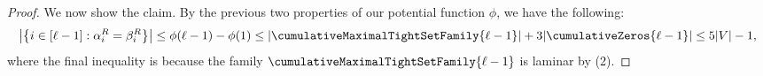 \begin{proof}
We now show the claim. By the previous two properties of our potential function $\phi$, we have the following:
$$\left|\left\{i \in [\ell - 1] : \alpha_i^R = \beta_i^R\right\}\right| \leq \phi(\ell - 1) - \phi(1) \leq |\cumulativeMaximalTightSetFamily{\ell - 1}| + 3|\cumulativeZeros{\ell - 1}| \leq 5|V| - 1,$$
where the final inequality is because the family $\cumulativeMaximalTightSetFamily{\ell - 1}$ is laminar by (2).
\end{proof}


